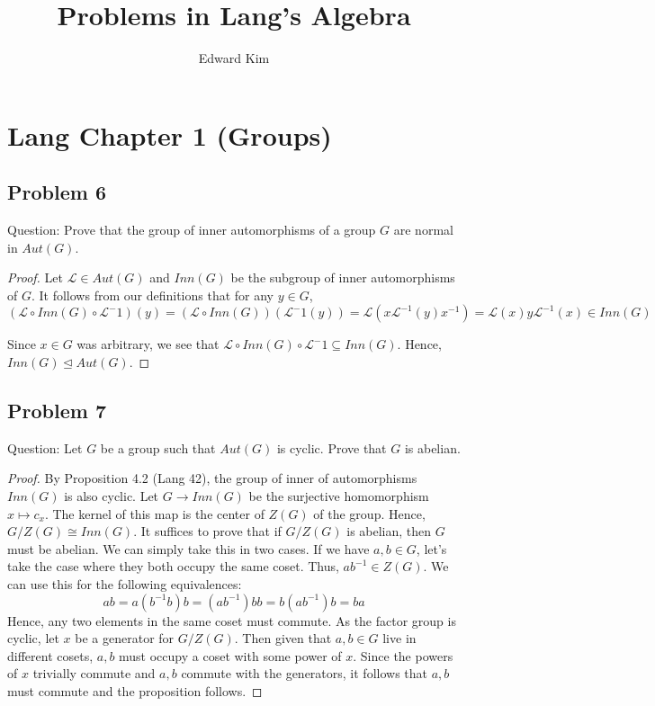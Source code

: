 \documentclass[12pt]{article}
\title{Problems in Lang's Algebra}
\author{Edward Kim}
\begin{document}
\maketitle
\hrulefill

\section*{Lang Chapter 1 (Groups)}
\subsection*{Problem 6}

Question: Prove that the group of inner automorphisms of a group $G$ are normal in $Aut(G)$. \par
\begin{proof}
Let $\mathcal{L} \in Aut(G)$ and $Inn(G)$ be the subgroup of inner automorphisms of $G$. It follows from our definitions that for any $y \in G$,  $$(\mathcal{L} \circ Inn(G) \circ \mathcal{L}^-1)(y) = (\mathcal{L} \circ Inn(G)) (\mathcal{L}^-1(y)) = \mathcal{L}(x \mathcal{L}^{-1}(y) x^{-1}) = \mathcal{L}(x) y \mathcal{L}^{-1}(x) \in Inn(G)$$

Since $x \in G$ was arbitrary, we see that $\mathcal{L} \circ Inn(G) \circ \mathcal{L}^-1 \subseteq Inn(G)$. Hence, $Inn(G) \trianglelefteq Aut(G)$. \end{proof}

\subsection*{Problem 7}

Question: Let $G$ be a group such that $Aut(G)$ is cyclic. Prove that $G$ is abelian.

\begin{proof}
By Proposition 4.2 (Lang 42), the group of inner of automorphisms $Inn(G)$ is also cyclic. Let $G \rightarrow Inn(G)$ be the surjective homomorphism $x \mapsto c_x$. The kernel of this map is the center of $Z(G)$ of the group. Hence, $G/Z(G) \cong Inn(G)$. It suffices to prove that if $G/Z(G)$ is abelian, then $G$ must be abelian. We can simply take this in two cases. If we have $a,b \in G$, let's take the case where they both occupy the same coset. Thus, $ab^{-1} \in Z(G)$. We can use this for the following equivalences:
 $$ ab = a(b^{-1}b)b = (ab^{-1})bb = b(ab^{-1})b = ba$$
 Hence, any two elements in the same coset must commute. As the factor group is cyclic, let $x$ be a generator for $G/Z(G)$. Then given that $a,b \in G$ live in different cosets, $a,b$ must occupy a coset with some power of $x$. Since the powers of $x$ trivially commute and $a,b$ commute with the generators, it follows that $a,b$ must commute and the proposition follows.
\end{proof}
\end{document}

